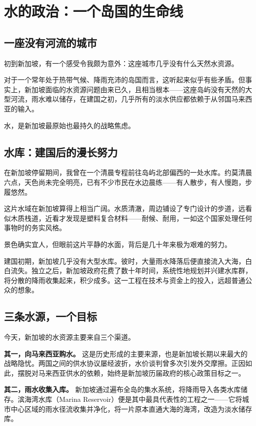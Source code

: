 \chapter{水的政治：一个岛国的生命线}

\section{一座没有河流的城市}

初到新加坡，有一个感受令我颇为意外：这座城市几乎没有什么天然水资源。

对于一个常年处于热带气候、降雨充沛的岛国而言，这听起来似乎有些矛盾。但事实上，新加坡面临的水资源问题由来已久，且相当根本——这座岛屿没有天然的大型河流，雨水难以储存，在建国之初，几乎所有的淡水供应都依赖于从邻国马来西亚的输入。

水，是新加坡最原始也最持久的战略焦虑。

\section{水库：建国后的漫长努力}

在新加坡停留期间，我曾在一个清晨专程前往岛屿北部偏西的一处水库。约莫清晨六点，天色尚未完全明亮，已有不少市民在水边晨练——有人散步，有人慢跑，步履悠然。

这片水域在新加坡算得上相当广阔。水质清澈，周边铺设了专门设计的步道，远看似木质栈道，近看才发现是塑料复合材料——耐候、耐用，一如这个国家处理任何事物时的务实风格。

景色确实宜人，但眼前这片平静的水面，背后是几十年来极为艰难的努力。

建国初期，新加坡几乎没有大型水库。彼时，大量雨水降落后便直接流入大海，白白流失。独立之后，新加坡政府花费了数十年时间，系统性地规划并兴建水库群，将分散的降雨收集起来，积少成多。这一工程在技术与资金上的投入，远超普通公众的想象。

\section{三条水源，一个目标}

今天，新加坡的水资源主要来自三个渠道。

\textbf{其一，向马来西亚购水。} 这是历史形成的主要来源，也是新加坡长期以来最大的战略隐忧。两国之间的供水协议屡经波折，水价谈判曾多次引发外交摩擦。正因如此，摆脱对马来西亚供水的依赖，始终是新加坡历届政府的核心政策目标之一。

\textbf{其二，雨水收集入库。} 新加坡通过遍布全岛的集水系统，将降雨导入各类水库储存。滨海湾水库（Marina Reservoir）便是其中最具代表性的工程之一——它将城市中心区域的雨水径流收集并净化，将一片原本直通大海的海湾，改造为淡水储存库。

